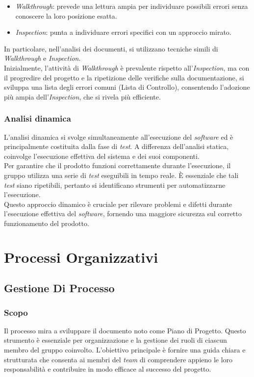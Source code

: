 \documentclass[5pt]{article}
\begin{document}
    \begin{itemize}
    \item \textit{Walkthrough}: prevede una lettura ampia per individuare possibili errori senza conoscere la loro posizione esatta.
    \item \textit{Inspection}: punta a individuare errori specifici con un approccio mirato.
    \end{itemize}
    In particolare, nell'analisi dei documenti, si utilizzano tecniche simili di \textit{Walkthrough} e \textit{Inspection}.\\
    Inizialmente, l'attività di \textit{Walkthrough} è prevalente rispetto all'\textit{Inspection}, ma con il progredire del progetto e la ripetizione delle verifiche sulla documentazione, si sviluppa una lista degli errori comuni (Lista di Controllo), consentendo l'adozione più ampia dell'\textit{Inspection}, che si rivela più efficiente.
    \subsubsection{Analisi dinamica}
    L'analisi dinamica si svolge simultaneamente all'esecuzione del \textit{software} ed è principalmente costituita dalla fase di \textit{test}. A differenza dell'analisi statica, coinvolge l'esecuzione effettiva del sistema e dei suoi componenti.\\
    Per garantire che il prodotto funzioni correttamente durante l'esecuzione, il gruppo utilizza una serie di \textit{test} eseguibili in tempo reale. È essenziale che tali \textit{test} siano ripetibili, pertanto si identificano strumenti per automatizzarne l'esecuzione.\\
    Questo approccio dinamico è cruciale per rilevare problemi e difetti durante l'esecuzione effettiva del \textit{software}, fornendo una maggiore sicurezza sul corretto funzionamento del prodotto.
    
\section{Processi Organizzativi}
\subsection{Gestione Di Processo}

\subsubsection{Scopo}
Il processo mira a sviluppare il documento noto come Piano di Progetto. Questo strumento è essenziale per organizzazione e la gestione dei ruoli di ciascun membro del gruppo coinvolto. L'obiettivo principale è fornire una guida chiara e strutturata che consenta ai membri del \textit{team} di comprendere appieno le loro responsabilità e contribuire in modo efficace al successo del progetto.
\end{document}
